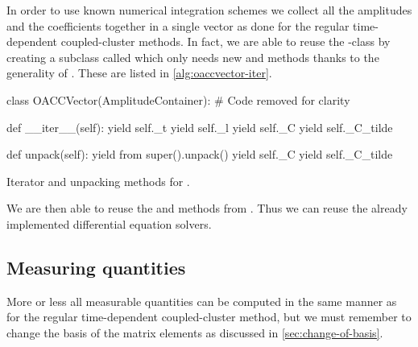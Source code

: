             In order to use known numerical integration schemes we collect all
            the amplitudes and the coefficients together in a single vector
            as done for the regular time-dependent coupled-cluster methods.
            In fact, we are able to reuse the -class by
            creating a subclass called  which only needs new
             and  methods thanks to the generality
            of .
            These are listed in \autoref{alg:oaccvector-iter}.
            \begin{algorithm}
                \begin{python}
class OACCVector(AmplitudeContainer):
    # Code removed for clarity

    def __iter__(self):
        yield self._t
        yield self._l
        yield self._C
        yield self._C_tilde

    def unpack(self):
        yield from super().unpack()
        yield self._C
        yield self._C_tilde
                \end{python}
                \caption{Iterator and unpacking methods for .}
                \label{alg:oaccvector-iter}
            \end{algorithm}
            We are then able to reuse the  and 
            methods from .
            Thus we can reuse the already implemented differential equation
            solvers.

        \subsection{Measuring quantities}
            More or less all measurable quantities can be computed in the same
            manner as for the regular time-dependent coupled-cluster method, but
            we must remember to change the basis of the matrix elements as
            discussed in \autoref{sec:change-of-basis}.

